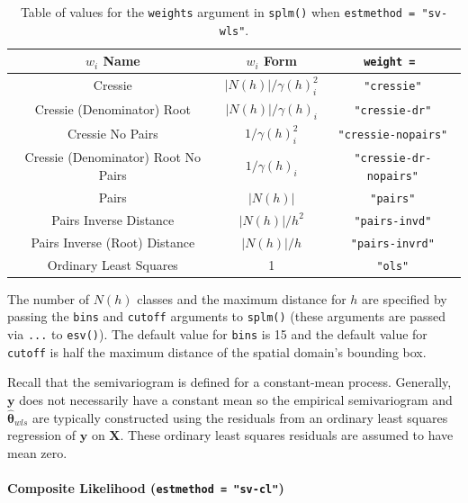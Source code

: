\documentclass[10pt,letterpaper]{article}
\begin{document}
\begin{table}
  \centering
  \begin{tabular}{c|c|c}
  \hline
  $w_i$ Name & $w_i$ Form & \texttt{weight = } \\
  \hline
  Cressie & $|N(h)| / \gamma(h)_i^2$ & \texttt{"cressie"} \\
  Cressie (Denominator) Root & $|N(h)| / \gamma(h)_i$ & \texttt{"cressie-dr"} \\
  Cressie No Pairs & $1 / \gamma(h)_i^2$ & \texttt{"cressie-nopairs"} \\
  Cressie (Denominator) Root No Pairs & $1 / \gamma(h)_i$ & \texttt{"cressie-dr-nopairs"} \\
  Pairs & $|N(h)|$ & \texttt{"pairs"} \\
  Pairs Inverse Distance & $|N(h)| / h^2$ & \texttt{"pairs-invd"} \\
  Pairs Inverse (Root) Distance & $|N(h)| / h$ & \texttt{"pairs-invrd"} \\
  Ordinary Least Squares & 1 & \texttt{"ols"} \\
  \hline
  \end{tabular}
  \caption{Table of values for the \texttt{weights} argument in \texttt{splm()} when \texttt{estmethod = "sv-wls"}.}
  \label{tab:weights}
\end{table}

The number of \(N(h)\) classes and the maximum distance for \(h\) are
specified by passing the \texttt{bins} and \texttt{cutoff} arguments to
\texttt{splm()} (these arguments are passed via \texttt{...} to
\texttt{esv()}). The default value for \texttt{bins} is 15 and the
default value for \texttt{cutoff} is half the maximum distance of the
spatial domain's bounding box.

Recall that the semivariogram is defined for a constant-mean process.
Generally, \(\mathbf{y}\) does not necessarily have a constant mean so
the empirical semivariogram and \(\boldsymbol{\hat{\theta}}_{wls}\) are
typically constructed using the residuals from an ordinary least squares
regression of \(\mathbf{y}\) on \(\mathbf{X}\). These ordinary least
squares residuals are assumed to have mean zero.

\hypertarget{composite-likelihood-estmethod-sv-cl}{%
\paragraph{\texorpdfstring{Composite Likelihood
(\texttt{estmethod\ =\ "sv-cl"})}{Composite Likelihood (estmethod = "sv-cl")}}\label{composite-likelihood-estmethod-sv-cl}}
\end{document}
